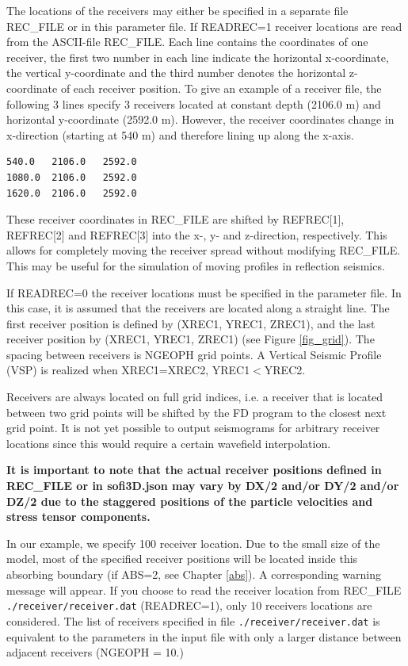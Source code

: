 \documentclass[11pt,onecolumn,oneside]{article}
\begin{document}
The locations of the receivers may either be specified in a separate file REC\_FILE or in this parameter file. If READREC=1 receiver locations are read from the ASCII-file REC\_FILE. Each line contains the coordinates of one receiver, the first two number in each line indicate the horizontal x-coordinate, the vertical y-coordinate and the third number denotes the horizontal z-coordinate of each receiver position. To give an example of a receiver file, the following 3 lines specify 3 receivers located at constant depth (2106.0 m) and horizontal y-coordinate (2592.0 m). However, the receiver coordinates change in x-direction (starting at 540 m) and therefore lining up along the x-axis.  
\begin{verbatim}
540.0   2106.0   2592.0   
1080.0  2106.0   2592.0
1620.0  2106.0   2592.0
\end{verbatim}
These receiver coordinates in REC\_FILE are shifted by REFREC[1], REFREC[2] and REFREC[3] into the  x-, y- and z-direction, respectively. This allows for completely moving the receiver spread without modifying REC\_FILE. This may be useful for the simulation of moving profiles in reflection seismics.

If READREC=0 the receiver locations must be specified in the parameter file. In this case, it is assumed that the receivers are located along a straight line. The first receiver position is defined by (XREC1, YREC1, ZREC1), and the last receiver position by (XREC1, YREC1, ZREC1) (see Figure \ref{fig_grid}). The spacing between receivers is NGEOPH grid points.  A Vertical Seismic Profile (VSP)
is realized when XREC1=XREC2, YREC1$<$YREC2.  

Receivers are always located on full grid indices, i.e. a receiver that is located between two grid points will be shifted by the FD program to the closest next grid point. It is not yet possible
to output seismograms for arbitrary receiver locations since this would require a certain wavefield interpolation.

\textbf{It is important to note that the actual receiver positions defined in REC\_FILE or in sofi3D.json may vary by DX/2 and/or DY/2 and/or DZ/2 due to the staggered positions of the particle velocities and stress tensor components. }

In our example, we specify 100 receiver location. Due to the small size of the model, most of the specified receiver positions will be located inside this absorbing boundary (if ABS=2, see Chapter \ref{abs}). A corresponding warning message will appear. If you choose to read the receiver location from REC\_FILE  \lstinline{./receiver/receiver.dat} (READREC=1), only 10 receivers locations are considered. The list of receivers specified in file  \lstinline{./receiver/receiver.dat} is equivalent to the parameters in the input file with only a larger distance between adjacent receivers (NGEOPH = 10.)
\end{document}
